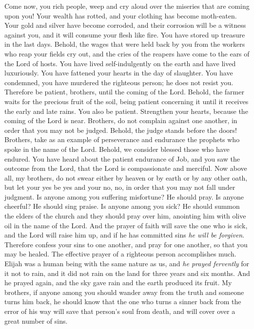 \begin{biblechapter} %
 Come now, you rich people, weep and cry aloud over the miseries that are coming upon you!
\verse Your wealth has rotted, and your clothing has become moth-eaten.
\verse Your gold and silver have become corroded, and their corrosion will be a witness against you, and it will consume your flesh like fire. You have stored up treasure in the last days.
\verse Behold, the wages that were held back by you from the workers who reap your fields cry out, and the cries of the reapers have come to the ears of the Lord of hosts.
\verse You have lived self-indulgently on the earth and have lived luxuriously. You have fattened your hearts in the day of slaughter.
\verse You have condemned, you have murdered the righteous person; he does not resist you.
 Therefore be patient, brothers, until the coming of the Lord. Behold, the farmer waits for the precious fruit of the soil, being patient concerning it until it receives the early and late rains.
\verse You also be patient. Strengthen your hearts, because the coming of the Lord is near.
\verse Brothers, do not complain against one another, in order that you may not be judged. Behold, the judge stands before the doors!
\verse Brothers, take as an example of perseverance and endurance the prophets who spoke in the name of the Lord.
\verse Behold, we consider blessed those who have endured. You have heard about the patient endurance of Job, and you saw the outcome from the Lord, that the Lord is compassionate and merciful.
\verse Now above all, my brothers, do not swear either by heaven or by earth or by any other oath, but let your yes be yes and your no, no, in order that you may not fall under judgment.
 Is anyone among you suffering misfortune? He should pray. Is anyone cheerful? He should sing praise.
\verse Is anyone among you sick? He should summon the elders of the church and they should pray over him, anointing him with olive oil in the name of the Lord.
\verse And the prayer of faith will save the one who is sick, and the Lord will raise him up, and if he has committed sins \textit{he will be forgiven}.
\verse Therefore confess your sins to one another, and pray for one another, so that you may be healed. The effective prayer of a righteous person accomplishes much.
\verse Elijah was a human being with the same nature as us, and \textit{he prayed fervently} for it not to rain, and it did not rain on the land for three years and six months.
\verse And he prayed again, and the sky gave rain and the earth produced its fruit.
\verse My brothers, if anyone among you should wander away from the truth and someone turns him back,
\verse he should know that the one who turns a sinner back from the error of his way will save that person’s soul from death, and will cover over a great number of sins.
\end{biblechapter}


